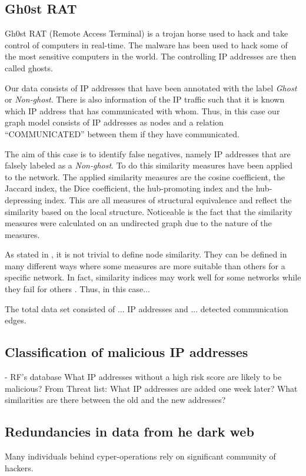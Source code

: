 \subsection{Gh0st RAT}
Gh0st RAT (Remote Access Terminal) is a trojan horse used to hack and take control of computers in real-time. The malware has been used to hack some of the most sensitive computers in the world. The controlling IP addresses are then called ghosts.


Our data consists of IP addresses that have been annotated with the label \textit{Ghost} or \textit{Non-ghost}. There is also information of the IP traffic such that it is known which IP address that has communicated with whom. Thus, in this case our graph model consists of IP addresses as nodes and a relation ``COMMUNICATED'' between them if they have communicated.

The aim of this case is to identify false negatives, namely IP addresses that are falsely labeled as a \textit{Non-ghost}. To do this similarity measures have been applied to the network. The applied similarity measures are the cosine coefficient, the Jaccard index, the Dice coefficient, the hub-promoting index and the hub-depressing index. This are all measures of structural equivalence and reflect the similarity based on the local structure. Noticeable is the fact that the similarity measures were calculated on an undirected graph due to the nature of the measures. 

As stated in , it is not trivial to define node similarity. They can be defined in many different ways where some measures are more suitable than others for a specific network. In fact, similarity indices may work well for some networks while they fail for others \citet{lu2011}. Thus, in this case...

The total data set consisted of ... IP addresses and ... detected communication edges. 


\subsection{Classification of malicious IP addresses }
- RF’s database
What IP addresses without a high risk score are likely to be malicious?
From Threat list: What IP addresses are added one week later? What similarities are there between the old and the new addresses? 

\subsection{Redundancies in data from he dark web}
Many individuals behind cyper-operations rely on significant community of hackers. 

